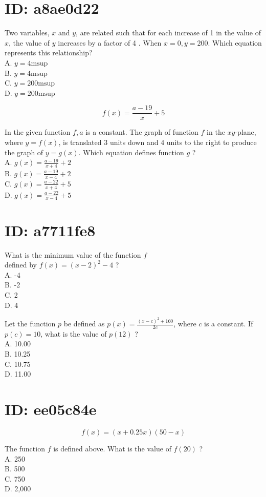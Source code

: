 \section*{ID: a8ae0d22}
Two variables, $x$ and $y$, are related such that for each increase of 1 in the value of $x$, the value of $y$ increases by a factor of 4 . When $x=0, y=200$. Which equation represents this relationship?\\
A. $y=4 \mathrm{msup}$\\
B. $y=4 \mathrm{msup}$\\
C. $y=200 \mathrm{msup}$\\
D. $y=200 \mathrm{msup}$

$$
f(x)=\frac{a-19}{x}+5
$$

In the given function $f, a$ is a constant. The graph of function $f$ in the $x y$-plane, where $y=f(x)$, is translated 3 units down and 4 units to the right to produce the graph of $y=g(x)$. Which equation defines function $g$ ?\\
A. $g(x)=\frac{a-19}{x+4}+2$\\
B. $g(x)=\frac{a-19}{x-4}+2$\\
C. $g(x)=\frac{a-22}{x+4}+5$\\
D. $g(x)=\frac{a-22}{x-4}+5$

\section*{ID: a7711fe8}
What is the minimum value of the function $f$\\
defined by $f(x)=(x-2)^{2}-4$ ?\\
A. -4\\
B. -2\\
C. 2\\
D. 4

Let the function $p$ be defined as $p(x)=\frac{(x-c)^{2}+160}{2 c}$, where $c$ is a constant. If $p(c)=10$, what is the value of $p(12)$ ?\\
A. 10.00\\
B. 10.25\\
C. 10.75\\
D. 11.00

\section*{ID: ee05c84e}
$$
f(x)=(x+0.25 x)(50-x)
$$

The function $f$ is defined above. What is the value of $f(20)$ ?\\
A. 250\\
B. 500\\
C. 750\\
D. 2,000


